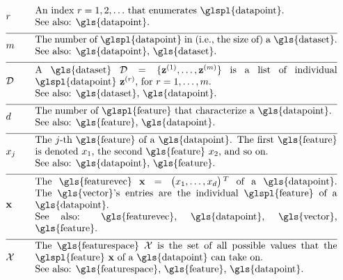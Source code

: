 \begin{align}
	&\sampleidx &\quad & \parbox{.90\textwidth}{An index $\sampleidx=1, 2, \ldots$ that 
		enumerates \glspl{datapoint}.
		\\ See also: \gls{datapoint}. }   \nonumber \\[2mm] \hline \nonumber\\[-5mm]
	&\samplesize &\quad &\parbox{.90\textwidth}{The number of \glspl{datapoint} in (i.e., the size of) a \gls{dataset}.
		\\ See also: \gls{datapoint}, \gls{dataset}.} \nonumber \\[2mm] \hline \nonumber\\[-5mm] 
	&\dataset &\quad & \parbox{.90\textwidth}{A \gls{dataset} $\dataset = \{ \datapoint^{(1)}, \ldots, \datapoint^{(\samplesize)} \}$ 
		is a list of individual \glspl{datapoint} $\datapoint^{(\sampleidx)}$, for $\sampleidx=1, \ldots, \samplesize$.
		\\ See also: \gls{dataset}, \gls{datapoint}.}   \nonumber \\[2mm] \hline \nonumber\\[-5mm]
	&\featurelen &\quad &\parbox{.90\textwidth}{The number of \glspl{feature} that characterize a \gls{datapoint}.
		\\ See also: \gls{feature}, \gls{datapoint}.}\nonumber \\[2mm] \hline \nonumber\\[-5mm]
	&\feature_{\featureidx} &\quad &\parbox{.90\textwidth}{The $\featureidx$-th \gls{feature} of a \gls{datapoint}. The first \gls{feature} 
		is denoted $\feature_{1}$, the second \gls{feature} $\feature_{2}$, and so on.
		\\ See also: \gls{datapoint}, \gls{feature}. } \nonumber \\[2mm] \hline \nonumber\\[-5mm] 
	&\featurevec &\quad &\parbox{.90\textwidth}{The \gls{featurevec} $\featurevec=\big(\feature_{1}, \ldots, \feature_{\featuredim}\big)\,^{T}$ of 
		a \gls{datapoint}. The \gls{vector}'s entries are the individual \glspl{feature} of a \gls{datapoint}.
		\\ See also: \gls{featurevec}, \gls{datapoint}, \gls{vector}, \gls{feature}. }\nonumber \\[2mm] \hline \nonumber\\[-5mm]
	&\featurespace &\quad & \parbox{.90\textwidth}{The \gls{featurespace} $\featurespace$ is 
		the set of all possible values that the \glspl{feature} $\featurevec$ of a \gls{datapoint} can take on.
		\\ See also: \gls{featurespace}, \gls{feature}, \gls{datapoint}.} \nonumber 
\end{align}        


